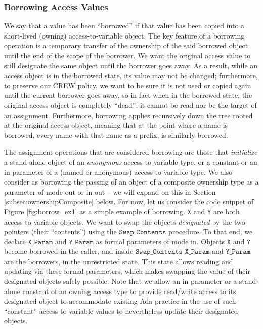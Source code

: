 \documentclass{llncs}
\newcommand\var[1]{\ensuremath{\mathtt{#1}}}
\newcommand{\keyword}[1]{\textsf{#1}}
\begin{document}
\subsubsection{Borrowing Access Values}
\label{sec:borrowing}

We say that a value has been ``borrowed'' if that value has been copied into a short-lived (owning) access-to-variable  object.
The key feature of a borrowing operation is a temporary transfer of the ownership of the said borrowed object until the end of the scope of the borrower.
We want the original access value to still designate the same object until the borrower goes away. As a result, while an access object
is in the borrowed state, its value may not be changed; furthermore, to preserve our CREW policy, we want to be sure it is not used or copied again until the current borrower goes away, so in fact when in the borrowed state, the original access object is completely ``dead''; it cannot
be read nor be the target of an assignment. Furthermore, borrowing applies recursively down the tree rooted at the original access object, meaning that at the point where a name is borrowed,
every name with that name as a prefix, is similarly borrowed.

\smallskip
The assignment operations that are considered borrowing are those that \textit{initialize} a stand-alone object of an \textit{anonymous} access-to-variable type, or a \keyword{constant} or an \keyword{in} parameter of a (named or anonymous) access-to-variable
type.  We also consider as borrowing the passing of an object of a composite ownership type
as a parameter of mode \keyword{out} or \keyword{in out} -- we will expand on this in Section \ref{subsec:ownershipComposite} below. For now, let us consider the
code snippet of Figure \ref{fig:borrow_ex1} as a simple example of borrowing. \var{X} and \var{Y} are both access-to-variable objects. We want to swap the objects \textit{designated} by the two
pointers (their ``contents'') using the \var{Swap\_Contents} procedure. To that end, we declare \var{X\_Param} and \var{Y\_Param} as formal parameters of mode \keyword{in}. Objects \var{X} and \var{Y} become borrowed
in the caller, and inside \var{Swap\_Contents} \var{X\_Param} and \var{Y\_Param} are the borrowers, in the unrestricted state. This state allows reading and updating via these formal parameters, which makes swapping
the value of their designated objects safely possible. Note that we allow an \keyword{in} parameter or a stand-alone constant of an owning access type to provide read/write access to its designated object to accommodate existing Ada practice in the use of such ``constant'' access-to-variable values to nevertheless update their designated objects.
\end{document}

